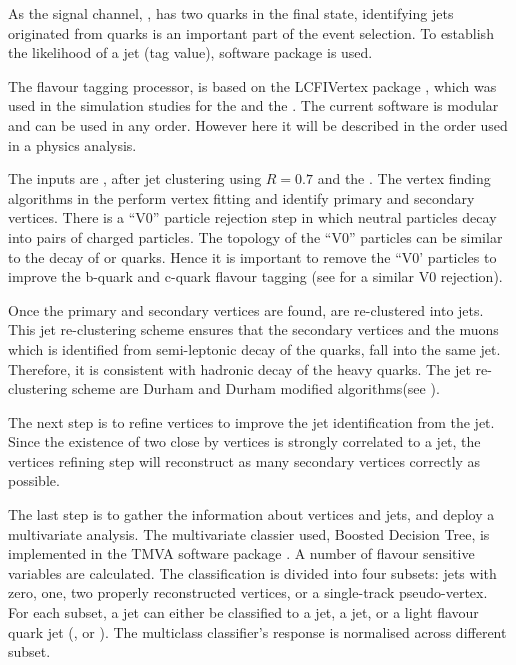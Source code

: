 As the signal channel, \eeToHHbbWWHad,  has two \Pbottom quarks in the final state, identifying jets originated from \Pbottom quarks is an important part of the event selection. To establish the likelihood of a \Pbottom jet (\Pbottom tag value), \lcfiplus \cite{Suehara:2015ura} software package is used.


The flavour tagging processor, \lcfiplus \cite{Suehara:2015ura} is based on the LCFIVertex package \cite{Bailey:2009ui}, which was used in the simulation studies for the \ILCloi \cite{Abe:2010aa,Aihara:2009ad} and the \CLICcdr \cite{Linssen:2012hp}.  The current software is modular and can be used in any order. However here it will be described in the order used in a physics analysis.


The inputs are \PFOs, after jet clustering using $R = 0.7$ and the \normalPFO. The vertex finding algorithms in the \lcfiplus perform vertex fitting and identify primary and secondary vertices. There is a ``V0'' particle rejection step in which neutral particles decay into pairs of charged particles. The topology of the ``V0'' particles can be  similar to the decay of \Pbottom or \Pcharm quarks. Hence it is important to remove the ``V0' particles to improve the b-quark and c-quark flavour tagging (see  for a similar V0 rejection).

Once the primary and secondary vertices are found, \PFOs are re-clustered into jets. This jet re-clustering scheme ensures that the secondary vertices and the muons which is identified from semi-leptonic decay of the quarks, fall into the same jet. Therefore, it is consistent with   hadronic decay of the heavy quarks. The jet re-clustering scheme are Durham and Durham modified algorithms(see ).

The next step is to refine vertices to improve the \Pbottom jet identification from the \Pcharm jet. Since the existence of two close by vertices is strongly correlated to a \Pbottom jet, the vertices refining step will reconstruct as many secondary vertices correctly as possible.

The last step is to gather the information about vertices and jets, and deploy a multivariate analysis. The multivariate classier used, Boosted Decision Tree,  is implemented in the TMVA software package \cite{Hocker:2007ht}. A number of flavour sensitive variables are calculated. The classification is divided into four subsets: jets with zero, one, two properly reconstructed vertices, or a single-track pseudo-vertex. For each subset, a jet can either be classified to a \Pbottom jet, a \Pcharm jet, or a light flavour quark jet (\Pup, \Pdown or \Pstrange). The multiclass classifier's response is normalised across different subset.

